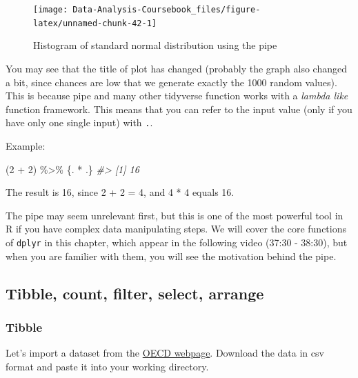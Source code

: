 \documentclass[
]{article}
\newenvironment{Shaded}{\begin{snugshade}}{\end{snugshade}}
\newcommand{\CommentTok}[1]{\textcolor[rgb]{0.56,0.35,0.01}{\textit{#1}}}
\newcommand{\DecValTok}[1]{\textcolor[rgb]{0.00,0.00,0.81}{#1}}
\newcommand{\NormalTok}[1]{#1}
\newcommand{\SpecialCharTok}[1]{\textcolor[rgb]{0.00,0.00,0.00}{#1}}
\begin{document}
\begin{figure}

{\centering \texttt{[image: Data-Analysis-Coursebook\_files/figure-latex/unnamed-chunk-42-1]} 

}

\caption{Histogram of standard normal distribution using the pipe}\label{fig:unnamed-chunk-42}
\end{figure}

You may see that the title of plot has changed (probably the graph also changed a bit, since chances are low that we generate exactly the 1000 random values). This is because pipe and many other tidyverse function works with a \emph{lambda like} function framework. This means that you can refer to the input value (only if you have only one single input) with \texttt{.}.

Example:

\begin{Shaded}
\begin{Highlighting}[]
\NormalTok{(}\DecValTok{2} \SpecialCharTok{+} \DecValTok{2}\NormalTok{) }\SpecialCharTok{\%\textgreater{}\%} 
\NormalTok{  \{. }\SpecialCharTok{*}\NormalTok{ .\}}
\CommentTok{\#\textgreater{} [1] 16}
\end{Highlighting}
\end{Shaded}

The result is 16, since 2 + 2 = 4, and 4 * 4 equals 16.

The pipe may seem unrelevant first, but this is one of the most powerful tool in R if you have complex data manipulating steps. We will cover the core functions of \texttt{dplyr} in this chapter, which appear in the following video (37:30 - 38:30), but when you are familier with them, you will see the motivation behind the pipe.

\hypertarget{tibble-count-filter-select-arrange}{%
\subsection{Tibble, count, filter, select, arrange}\label{tibble-count-filter-select-arrange}}

\hypertarget{tibble}{%
\subsubsection{Tibble}\label{tibble}}

Let's import a dataset from the \href{https://data.oecd.org/pop/fertility-rates.htm\#indicator-chart}{OECD webpage}. Download the data in csv format and paste it into your working directory.
\end{document}

